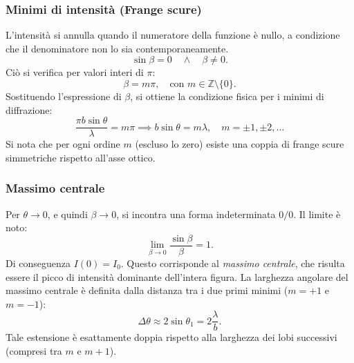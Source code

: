 \documentclass[a4paper,11pt]{report}
\begin{document}
\subsubsection{Minimi di intensità (Frange scure)}
L'intensità si annulla quando il numeratore della funzione è nullo, a condizione che il denominatore non lo sia contemporaneamente.
\begin{equation}
    \sin\beta = 0 \quad \wedge \quad \beta \neq 0.
\end{equation}
Ciò si verifica per valori interi di $\pi$:
\begin{equation}
    \beta = m\pi, \quad \text{con } m \in \mathbb{Z} \setminus \{0\}.
\end{equation}
Sostituendo l'espressione di $\beta$, si ottiene la condizione fisica per i minimi di diffrazione:
\begin{equation}
    \frac{\pi b \sin\theta}{\lambda} = m\pi \implies b\sin\theta = m\lambda, \quad m = \pm 1, \pm 2, \dots
\end{equation}
Si nota che per ogni ordine $m$ (escluso lo zero) esiste una coppia di frange scure simmetriche rispetto all'asse ottico.

\subsubsection{Massimo centrale}
Per $\theta \to 0$, e quindi $\beta \to 0$, si incontra una forma indeterminata $0/0$. Il limite è noto:
\begin{equation}
    \lim_{\beta \to 0} \frac{\sin\beta}{\beta} = 1.
\end{equation}
Di conseguenza $I(0) = I_0$. Questo corrisponde al \textit{massimo centrale}, che risulta essere il picco di intensità dominante dell'intera figura.
La larghezza angolare del massimo centrale è definita dalla distanza tra i due primi minimi ($m = +1$ e $m = -1$):
\begin{equation}
    \Delta\theta \approx 2\sin\theta_1 = 2\frac{\lambda}{b}.
\end{equation}
Tale estensione è esattamente doppia rispetto alla larghezza dei lobi successivi (compresi tra $m$ e $m+1$).
\end{document}
